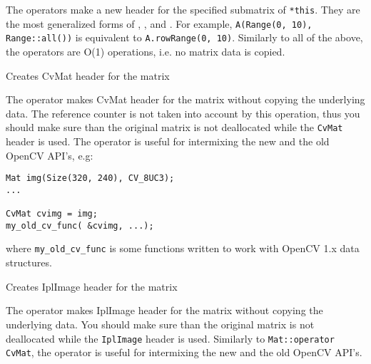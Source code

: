 \begin{description}
\end{description}

The operators make a new header for the specified submatrix of \texttt{*this}. They are the most generalized forms of , ,  and . For example, \texttt{A(Range(0, 10), Range::all())} is equivalent to \texttt{A.rowRange(0, 10)}. Similarly to all of the above, the operators are O(1) operations, i.e. no matrix data is copied.

Creates CvMat header for the matrix


The operator makes CvMat header for the matrix without copying the underlying data. The reference counter is not taken into account by this operation, thus you should make sure than the original matrix is not deallocated while the \texttt{CvMat} header is used. The operator is useful for intermixing the new and the old OpenCV API's, e.g:

\begin{lstlisting}
Mat img(Size(320, 240), CV_8UC3);
...

CvMat cvimg = img;
my_old_cv_func( &cvimg, ...);
\end{lstlisting}

where \texttt{my\_old\_cv\_func} is some functions written to work with OpenCV 1.x data structures.


Creates IplImage header for the matrix


The operator makes IplImage header for the matrix without copying the underlying data. You should make sure than the original matrix is not deallocated while the \texttt{IplImage} header is used. Similarly to \texttt{Mat::operator CvMat}, the operator is useful for intermixing the new and the old OpenCV API's.


